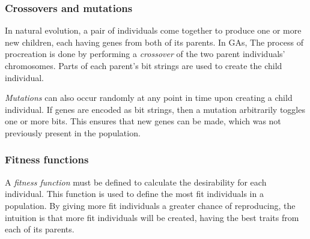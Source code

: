 
\subsubsection{Crossovers and mutations}
In natural evolution, a pair of individuals come together to produce one or more new children, each having genes from both of its parents. In GAs, The process of procreation is done by performing a \emph{crossover} of the two parent individuals' chromosomes. Parts of each parent's bit strings are used to create the child individual.

\emph{Mutations} can also occur randomly at any point in time upon creating a child individual. If genes are encoded as bit strings, then a mutation arbitrarily toggles one or more bits. This ensures that new genes can be made, which was not previously present in the population.

\subsubsection{Fitness functions}
A \emph{fitness function} must be defined to calculate the desirability for each individual. This function is used to define the most fit individuals in a population. By giving more fit individuals a greater chance of reproducing, the intuition is that more fit individuals will be created, having the best traits from each of its parents.

